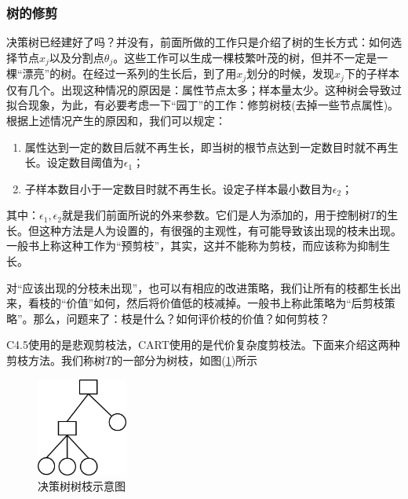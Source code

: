         \subsubsection{树的修剪}
            \par
            决策树已经建好了吗？并没有，前面所做的工作只是介绍了树的生长方式：如何选择节点$x_j$以及分割点$\theta_j$。这些工作可以生成一棵枝繁叶茂的树，但并不一定是一棵“漂亮”的树。在经过一系列的生长后，到了用$x_j$划分的时候，发现$x_j$下的子样本仅有几个。出现这种情况的原因是：属性节点太多；样本量太少。这种树会导致过拟合现象，为此，有必要考虑一下“园丁”的工作：修剪树枝(去掉一些节点属性)。根据上述情况产生的原因和，我们可以规定：
            \begin{enumerate}
            \item 属性达到一定的数目后就不再生长，即当树的根节点达到一定数目时就不再生长。设定数目阈值为$\epsilon_1$；
            \item 子样本数目小于一定数目时就不再生长。设定子样本最小数目为$\epsilon_2$；
            \end{enumerate}
            其中：$\epsilon_1,\epsilon_2$就是我们前面所说的外来参数。它们是人为添加的，用于控制树$T$的生长。但这种方法是人为设置的，有很强的主观性，有可能导致该出现的枝未出现。一般书上称这种工作为“预剪枝”，其实，这并不能称为剪枝，而应该称为抑制生长。
            \par
            对“应该出现的分枝未出现”，也可以有相应的改进策略，我们让所有的枝都生长出来，看枝的“价值”如何，然后将价值低的枝减掉。一般书上称此策略为“后剪枝策略”。那么，问题来了：枝是什么？如何评价枝的价值？如何剪枝？
            \par
            C4.5使用的是悲观剪枝法，CART使用的是代价复杂度剪枝法。下面来介绍这两种剪枝方法。我们称树$T$的一部分为树枝，如图(\ref{fig:决策树树枝示意图})所示
                \begin{figure}[H]
                \centering
                \includegraphics[width=3cm]{images/Decision_tree_branches.jpg}
                \caption{决策树树枝示意图}
                \label{fig:决策树树枝示意图}
                \end{figure}
